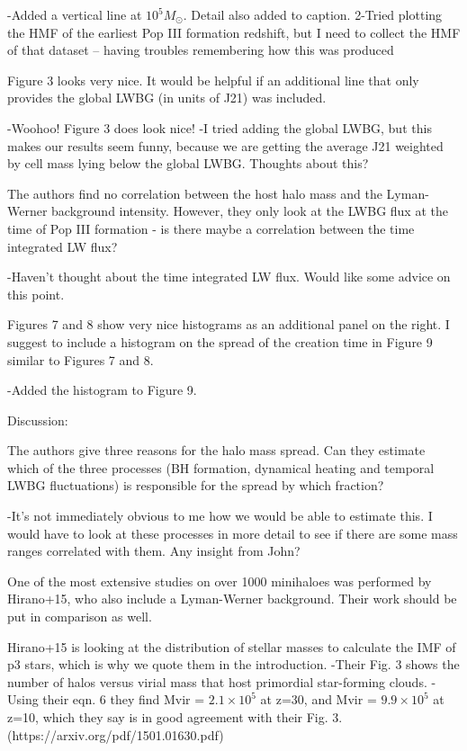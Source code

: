 \documentclass[11pt]{article}
\newenvironment{referee}[1][]{%
    \ignorespaces%
    \begin{mdframed}[style=myquotestyle,#1]%
}{%
    \end{mdframed}%
    \ignorespacesafterend%
}%
\begin{document}
-Added a vertical line at $10^5 M_{\odot}$. Detail also added to caption.
2-Tried plotting the HMF of the earliest Pop III formation redshift, but I need to collect the HMF of that dataset -- having troubles remembering how this was produced 


\begin{referee}
Figure 3 looks very nice. It would be helpful if an additional line that only 
provides the global LWBG (in units of J21) was included.
\end{referee}
-Woohoo! Figure 3 does look nice!
-I tried adding the global LWBG, but this makes our results seem funny, because we are getting the average J21 weighted by cell mass lying below the global LWBG. Thoughts about this?

\begin{referee}
The authors find no correlation between the host halo mass and the Lyman-Werner background intensity. However, they only look at the LWBG flux at the time of Pop III formation - is there maybe a correlation between the time integrated LW flux?
\end{referee}
-Haven't thought about the time integrated LW flux. Would like some advice on this point. 

\begin{referee}
Figures 7 and 8 show very nice histograms as an additional panel on the right.  I suggest to include a histogram on the spread of the creation time in Figure 9 similar to Figures 7 and 8.
\end{referee}
-Added the histogram to Figure 9. 

\begin{referee}
Discussion:

The authors give three reasons for the halo mass spread. Can they estimate which of the three processes (BH formation, dynamical heating and temporal LWBG fluctuations) is responsible for the spread by which fraction?
\end{referee}
-It's not immediately obvious to me how we would be able to estimate this. I would have to look at these processes in more detail to see if there are some mass ranges correlated with them. Any insight from John?

\begin{referee}
One of the most extensive studies on over 1000 minihaloes was performed by Hirano+15, who also include a Lyman-Werner background. Their work should be put in comparison as well.
\end{referee}
Hirano+15 is looking at the distribution of stellar masses to calculate the IMF of p3 stars, which is why we quote them in the introduction. 
-Their Fig. 3 shows the number of halos versus virial mass that host primordial star-forming clouds. 
-Using their eqn. 6 they find Mvir = $2.1 \times 10^5$ at z=30, and Mvir = $9.9 \times 10^5$ at z=10, which they say is in good agreement with their Fig. 3. 
(https://arxiv.org/pdf/1501.01630.pdf)
\end{document}

